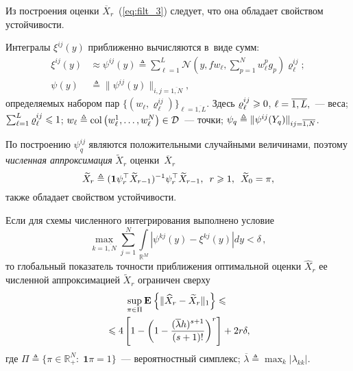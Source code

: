 \begin{multicols}{2}
 Из построения оценки $\overline{X}_r$~(\ref{eq:filt_3}) следует, что она 
обладает свойством устойчивости.

 Интегралы $\xi^{ij}(y)$ приближенно вычисляются в~виде сумм:
 \begin{align*}
 \!\!\xi^{ij}(y) &\displaystyle
\approx \psi^{ij}(y) \triangleq
 \sum\limits_{\ell=1}^{L} \mathcal{N}\!\left( \! y,f 
w_{\ell},\sum\limits_{p=1}^N w^p_{\ell} g_p \!\right)\varrho_{\ell}^{ij}; \\
\! \!\psi(y) &\triangleq \|\psi^{ij}(y)\|_{i,j=\overline{1,N}}, 
 \end{align*}
 определяемых набором пар 
$\{(w_{\ell},\varrho_{\ell}^{ij})\}_{\ell=\overline{1,L}}$. Здесь 
$\varrho_{\ell}^{ij} \hm\geqslant 0$, $\ell\hm=\overline{1,L},$~--- веса; 
$\sum\nolimits_{\ell=1}^L\varrho_{\ell}^{ij} \hm\leqslant 1$; 
$w_{\ell}\hm\triangleq 
\mathrm{col}\left(w^1_{\ell},\ldots,w^N_{\ell}\right) \hm\in 
\mathcal{D}$~--- точки; $\psi_q \hm\triangleq \|\psi^{ij}(Y_q)\|_{ij=\overline{1,N}}$.

 По построению $\psi^{ij}_q$ являются положительными случайными 
величинами, поэтому \textit{численная аппроксимация} $\widetilde{X}_r$ 
оценки~$\overline{X}_r$
 \begin{equation*}
 \widetilde{X}_r \triangleq (\mathbf{1}\psi_r^{\top}  
\widetilde{X}_{r-1})^{-1}\psi_r^{\top} \widetilde{X}_{r-1}, \enskip 
r\geqslant 1, \enskip \widetilde{X}_{0} = \pi,
 \end{equation*}
 также обладает свойством устойчивости.

Если для схемы численного интегрирования выполнено условие
$$ %
\max\limits_{k=\overline{1,N}} \sum\limits_{j=1}^N
\int\limits_{\mathbb{R}^M}|\psi^{kj}(y) - \xi^{kj}(y)|dy < \delta\,,
$$
то глобальный показатель точности приближения оптимальной оценки
$\widehat{X}_r$ ее численной аппроксимацией $\widetilde{X}_r$
ограничен сверху
 \begin{multline} %
\sup\limits_{\pi \in \Pi}\me{}{\|\widehat{X}_r - \widetilde{X}_r\|_1} 
\leqslant{}\\
{}\leqslant  4
\left[ 1-\left(1-\fr{(\overline{\lambda}h)^{s+1}}{(s+1)!}\right)^r
\right] + 2r\delta,
 \label{eq:tot_glob}
 \end{multline}
 где $\Pi \triangleq \{\pi \in \mathbb{R}^N_+:\; \mathbf{1}\pi=1\}$~--- 
вероятностный симплекс; $\overline{\lambda} \triangleq 
\max_k|\lambda_{kk}|$.


\end{multicols}
